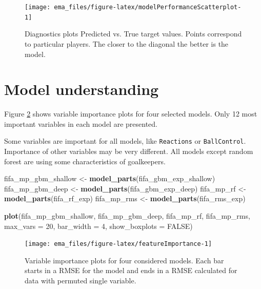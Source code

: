 \documentclass[]{krantz}
\newenvironment{Shaded}{\begin{snugshade}}{\end{snugshade}}
\newcommand{\DataTypeTok}[1]{\textcolor[rgb]{0.13,0.29,0.53}{#1}}
\newcommand{\DecValTok}[1]{\textcolor[rgb]{0.00,0.00,0.81}{#1}}
\newcommand{\KeywordTok}[1]{\textcolor[rgb]{0.13,0.29,0.53}{\textbf{#1}}}
\newcommand{\NormalTok}[1]{#1}
\newcommand{\OtherTok}[1]{\textcolor[rgb]{0.56,0.35,0.01}{#1}}
\newcommand{\StringTok}[1]{\textcolor[rgb]{0.31,0.60,0.02}{#1}}
\begin{document}
\begin{figure}

{\centering \texttt{[image: ema\_files/figure-latex/modelPerformanceScatterplot-1]} 

}

\caption{Diagnostics plots Predicted vs. True target values. Points correspond to particular players. The closer to the diagonal the better is the model.}\label{fig:modelPerformanceScatterplot}
\end{figure}

\hypertarget{model-understanding-1}{%
\section{Model understanding}\label{model-understanding-1}}

Figure \ref{fig:featureImportance} shows variable importance plots for four selected models. Only 12 most important variables in each model are presented.

Some variables are important for all models, like \texttt{Reactions} or \texttt{BallControl}. Importance of other variables may be very different. All models except random forest are using some characteristics of goalkeepers.

\begin{Shaded}
\begin{Highlighting}[]
\NormalTok{fifa_mp_gbm_shallow <-}\StringTok{ }\KeywordTok{model_parts}\NormalTok{(fifa_gbm_exp_shallow)}
\NormalTok{fifa_mp_gbm_deep <-}\StringTok{ }\KeywordTok{model_parts}\NormalTok{(fifa_gbm_exp_deep)}
\NormalTok{fifa_mp_rf <-}\StringTok{ }\KeywordTok{model_parts}\NormalTok{(fifa_rf_exp)}
\NormalTok{fifa_mp_rms <-}\StringTok{ }\KeywordTok{model_parts}\NormalTok{(fifa_rms_exp)}

\KeywordTok{plot}\NormalTok{(fifa_mp_gbm_shallow, fifa_mp_gbm_deep, }
\NormalTok{     fifa_mp_rf, fifa_mp_rms,}
     \DataTypeTok{max_vars =} \DecValTok{20}\NormalTok{, }\DataTypeTok{bar_width =} \DecValTok{4}\NormalTok{, }\DataTypeTok{show_boxplots =} \OtherTok{FALSE}\NormalTok{) }
\end{Highlighting}
\end{Shaded}

\begin{figure}

{\centering \texttt{[image: ema\_files/figure-latex/featureImportance-1]} 

}

\caption{Variable importance plots for four considered models. Each bar starts in a RMSE for the model and ends in a RMSE calculated for data with permuted single variable.}\label{fig:featureImportance}
\end{figure}
\end{document}
